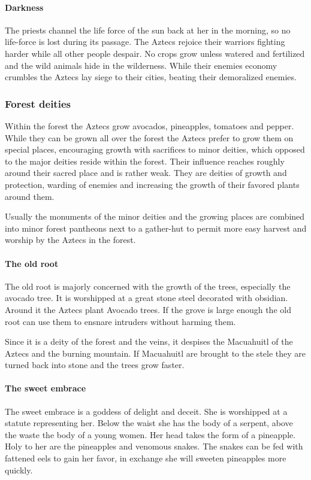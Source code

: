 \documentclass[a4paper]{book}
\begin{document}
			\paragraph{Darkness}
				The priests channel the life force of the sun back at her in the morning,
				so no life-force is lost during its passage.
				The \gls{Aztecs} rejoice their warriors fighting harder while all other people
				despair.
				No crops grow unless watered and fertilized and the wild animals hide in the wilderness.
				While their enemies economy crumbles the \gls{Aztecs} lay siege to their cities,
				beating their demoralized enemies.

		\subsubsection{Forest deities}
			Within the forest the \gls{Aztecs} grow avocados, pineapples, tomatoes and pepper.
			While they can be grown all over the forest the \gls{Aztecs} prefer to grow
			them on special places, encouraging growth with sacrifices to minor deities,
			which opposed to the major deities reside within the forest.
			Their influence reaches roughly around their sacred place and is rather weak.
			They are deities of growth and protection, warding of enemies and increasing
			the growth of their favored plants around them.

			Usually the monuments of the minor deities and the growing places are combined
			into minor forest pantheons next to a gather-hut to permit more easy harvest
			and worship by the \gls{Aztecs} in the forest.

			\paragraph{The old root}
				The old root is majorly concerned with the growth of the trees, especially the avocado tree.
				It is worshipped at a great stone steel decorated with obsidian.
				Around it the \gls{Aztecs} plant Avocado trees.
				If the grove is large enough the old root can use them to ensnare
				intruders without harming them.

				Since it is a deity of the forest and the veins,
				it despises the Macuahuitl of the \gls{Aztecs} and the burning mountain.
				If Macuahuitl are brought to the stele they are turned back into stone and the trees grow faster.

			\paragraph{The sweet embrace}
				The sweet embrace is a goddess of delight and deceit.
				She is worshipped at a statute representing her.
				Below the waist she has the body of a serpent,
				above the waste the body of a young women.
				Her head takes the form of a pineapple.
				Holy to her are the pineapples and venomous snakes.
				The snakes can be fed with fattened eels to gain her favor,
				in exchange she will sweeten pineapples more quickly.
\end{document}
